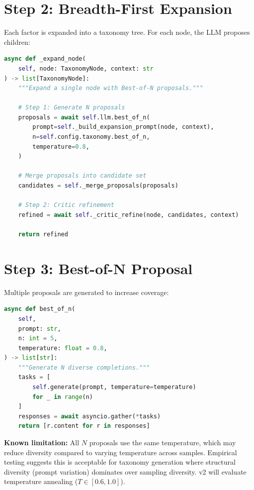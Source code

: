 \section{Step 2: Breadth-First Expansion}

Each factor is expanded into a taxonomy tree. For each node, the LLM proposes children:

\begin{lstlisting}[language=Python,caption={Node expansion (simula\_taxonomy\_builder.py, lines 180--220)}]
async def _expand_node(
    self, node: TaxonomyNode, context: str
) -> list[TaxonomyNode]:
    """Expand a single node with Best-of-N proposals."""
    
    # Step 1: Generate N proposals
    proposals = await self.llm.best_of_n(
        prompt=self._build_expansion_prompt(node, context),
        n=self.config.taxonomy.best_of_n,
        temperature=0.8,
    )
    
    # Merge proposals into candidate set
    candidates = self._merge_proposals(proposals)
    
    # Step 2: Critic refinement
    refined = await self._critic_refine(node, candidates, context)
    
    return refined
\end{lstlisting}

\section{Step 3: Best-of-N Proposal}

Multiple proposals are generated to increase coverage:

\begin{lstlisting}[language=Python,caption={Best-of-N sampling}]
async def best_of_n(
    self,
    prompt: str,
    n: int = 5,
    temperature: float = 0.8,
) -> list[str]:
    """Generate N diverse completions."""
    tasks = [
        self.generate(prompt, temperature=temperature)
        for _ in range(n)
    ]
    responses = await asyncio.gather(*tasks)
    return [r.content for r in responses]
\end{lstlisting}

\textbf{Known limitation:} All $N$ proposals use the same temperature, which may reduce 
diversity compared to varying temperature across samples. Empirical testing suggests 
this is acceptable for taxonomy generation where structural diversity (prompt variation) 
dominates over sampling diversity. v2 will evaluate temperature annealing ($T \in [0.6, 1.0]$).


